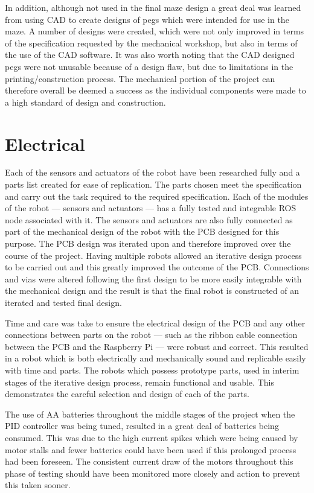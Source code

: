 In addition, although not used in the final maze design a great deal was learned from 
using CAD to create designs of pegs which were intended for use in the maze. A number 
of designs were created, which were not only improved in terms of the specification 
requested by the mechanical workshop, but also in terms of the use of the CAD 
software. It was also worth noting that the CAD designed pegs were not unusable 
because of a design flaw, but due to limitations in the printing/construction process. 
The mechanical portion of the project can therefore overall be deemed a success as 
the individual components were made to a high standard of design and construction. 

\section{Electrical}\label{eval/elec}
Each of the sensors and actuators of the robot have been researched fully and a 
parts list created for ease of replication. The parts chosen meet the 
specification and carry out the task required to the required specification. 
Each of the modules of the robot --- sensors and actuators --- has a fully 
tested and integrable ROS node associated with it. The sensors and actuators are 
also fully connected as part of the mechanical design of the robot with the PCB 
designed for this purpose. The PCB design was iterated upon and therefore 
improved over the course of the project. Having multiple robots allowed an 
iterative design process to be carried out and this greatly improved the outcome 
of the PCB. Connections and vias were altered following the first design to be 
more easily integrable with the mechanical design and the result is that the final robot is 
constructed of an iterated and tested final design. 

Time and care was take to ensure the electrical design of the PCB and any other 
connections between parts on the robot --- such as the ribbon cable connection 
between the PCB and the Raspberry Pi --- were robust and correct. This resulted 
in a robot which is both electrically and mechanically sound and replicable 
easily with time and parts. The robots which possess prototype parts, used in 
interim stages of the iterative design process, remain functional and usable. 
This demonstrates the careful selection and design of each of the parts. 

The use of AA batteries throughout the middle stages of the project when the PID 
controller was being tuned, resulted in a great deal of batteries being consumed. 
This was due to the high current spikes which were being caused by motor stalls and 
fewer batteries could have been used if this prolonged process had been foreseen. The 
consistent current draw of the motors throughout this phase of testing should have 
been monitored more closely and action to prevent this taken sooner.   

